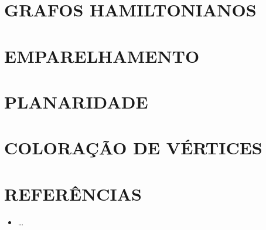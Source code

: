 \documentclass[
12pt,
a4paper,
semrecuonosumario,
sumario = abnt-6027-2012]{report}
\begin{document}
	\chapter{GRAFOS HAMILTONIANOS}\label{cap:grafosHamiltonianos}


	\chapter{EMPARELHAMENTO}\label{cap:emparelhamento}


	\chapter{PLANARIDADE}\label{cap:planaridade}


	\chapter{COLORAÇÃO DE VÉRTICES}\label{cap:coloracaoVertices}


	\clearpage
	\chapter*{REFERÊNCIAS}
	\vspace{-0.5em}
	\begin{itemize}
		\item \dots
	\end{itemize}
\end{document}
